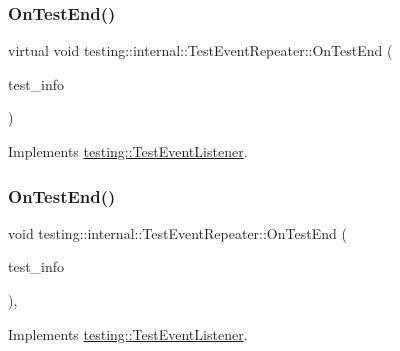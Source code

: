 \subsubsection{\texorpdfstring{OnTestEnd()}{OnTestEnd()}\hspace{0.1cm}{\footnotesize\ttfamily [1/3]}}
{\footnotesize\ttfamily virtual void testing\+::internal\+::\+Test\+Event\+Repeater\+::\+On\+Test\+End (\begin{DoxyParamCaption}\item[{const \mbox{\hyperlink{classtesting_1_1_test_info}{Test\+Info}} \&}]{test\+\_\+info }\end{DoxyParamCaption})\hspace{0.3cm}{\ttfamily [virtual]}}



Implements \mbox{\hyperlink{classtesting_1_1_test_event_listener_abb1c44525ef038500608b5dc2f17099b}{testing\+::\+Test\+Event\+Listener}}.

\mbox{\label{classtesting_1_1internal_1_1_test_event_repeater_a0f524b2773bf2cbf6df1269975c5a79f}} 
\subsubsection{\texorpdfstring{OnTestEnd()}{OnTestEnd()}\hspace{0.1cm}{\footnotesize\ttfamily [2/3]}}
{\footnotesize\ttfamily void testing\+::internal\+::\+Test\+Event\+Repeater\+::\+On\+Test\+End (\begin{DoxyParamCaption}\item[{const \mbox{\hyperlink{classtesting_1_1_test_info}{Test\+Info}} \&}]{test\+\_\+info }\end{DoxyParamCaption})\hspace{0.3cm}{\ttfamily [override]}, {\ttfamily [virtual]}}



Implements \mbox{\hyperlink{classtesting_1_1_test_event_listener_abb1c44525ef038500608b5dc2f17099b}{testing\+::\+Test\+Event\+Listener}}.

\mbox{\label{classtesting_1_1internal_1_1_test_event_repeater_a0f524b2773bf2cbf6df1269975c5a79f}} 
